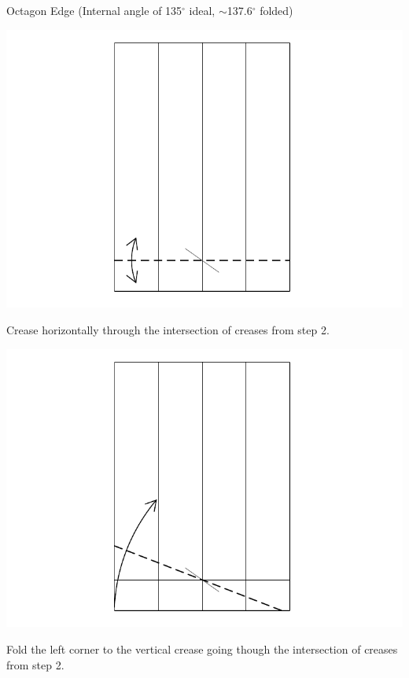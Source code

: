 \documentclass[11pt]{article}
\begin{document}
\newpage
{\Large Octagon Edge} (Internal angle of 135$^\circ$ ideal, $\sim$137.6$^\circ$ folded)
\vspace*{0.25in}

\begin{minipage}[t]{0.3\textwidth}
  \includegraphics[width=\textwidth]{../figs/fig08-04}
  \begin{itemize}{\item[4.] Crease horizontally through the intersection of creases from step 2.}\end{itemize}
\end{minipage}
\begin{minipage}[t]{0.3\textwidth}
  \includegraphics[width=\textwidth]{../figs/fig08-05}
  \begin{itemize}{\item[5.] Fold the left corner to the  vertical crease going though the intersection of creases from step 2.}\end{itemize}
\end{minipage}
\end{document}
